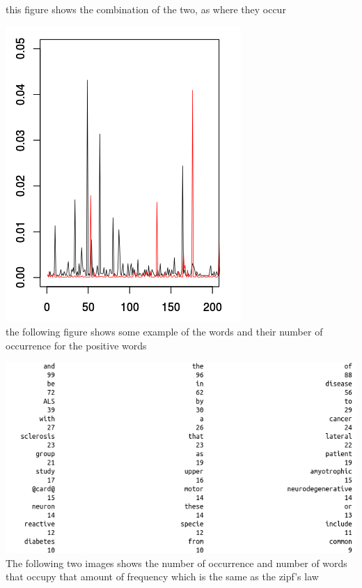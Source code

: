 \documentclass{article}
\begin{document}
	this figure shows the combination of the two, as where they occur
	
	\includegraphics[width=0.8\linewidth]{Amytrophic3.png}\\
	the following figure shows some example of the words and their number of occurrence for the positive words 
	
	\includegraphics[width=0.8\linewidth]{Amytrophic4.png}\\
	The following two images shows the number of occurrence and number of words that occupy that amount of frequency which is the same as the zipf's law
	
\end{document}
